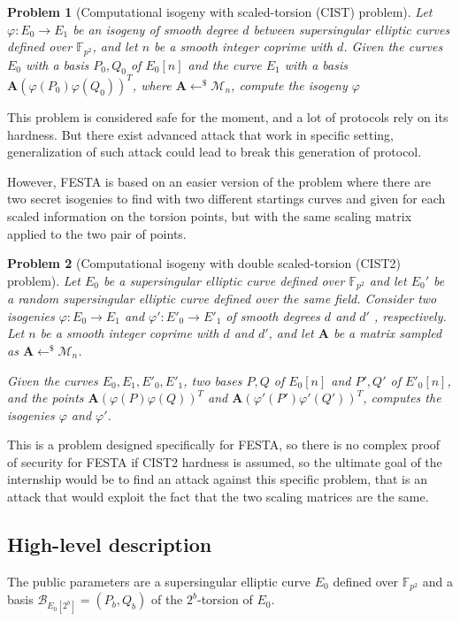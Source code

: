 \documentclass[12pt,a4paper]{article}
\newtheorem{problem}{Problem}
\begin{document}
			\begin{problem}[Computational isogeny with scaled-torsion (CIST) problem]

				Let $\varphi:E_0\to E_1$ be an isogeny of smooth degree $d$ between supersingular elliptic curves
				defined over $\mathbb F_{p^{2}}$, and let $n$ be a smooth integer coprime with $d$.
				Given the curves $E_0$ with a basis $P_0,Q_0$ of $E_0[n]$ and the curve $E_1$ with a basis
			$\mathbf A{(\varphi(P_0) \varphi(Q_0))}^{T}$, where $\mathbf A\gets^\$\mathcal M_n$, compute the
				isogeny  $\varphi$
			\end{problem}
	
			This problem is considered safe for the moment, and a lot of protocols rely on its hardness. But
			there exist advanced attack that work in specific setting, generalization of such attack could lead
			to break this generation of protocol. 


			However, FESTA is based on an easier version of the problem
			where there are two secret isogenies to find with two different startings curves and given
			for each scaled information on the torsion points, but with the same scaling matrix applied to the
			two pair of points.

		\begin{problem}[Computational isogeny with double scaled-torsion (CIST2) problem]
			Let $E_0$ be a supersingular elliptic curve defined over $\mathbb{F}_{p^2}$ and
			let  $E_0'$ be a random supersingular elliptic curve defined over the same field.
			Consider two isogenies $\varphi:E_0\to E_1$ and $\varphi':E'_0\to E'_1$ of smooth
			degrees $d$ and $d'$ , respectively. Let $n$ be a smooth integer coprime with $d$ and 
			$d'$, and let $\mathbf A $ be a matrix sampled as $\mathbf A\gets^{\$}\mathcal M_n$.

			Given the curves  $E_0,E_1,E'_0,E'_1$, two bases $P,Q$ of $E_0[n]$ and $P',Q'$ of
			$E'_0[n]$, and the points $\mathbf A(\varphi(P)\varphi(Q))^T$ and $\mathbf A
			(\varphi'(P')\varphi'(Q'))^T$, computes the isogenies $\varphi$ and $\varphi'$.
		\end{problem}

		This is a problem designed specifically for FESTA, so there is no complex proof of security for
		FESTA if CIST2 hardness is assumed, so the ultimate goal of the internship would be to find an attack
		against this specific problem, that is an attack that would exploit the fact that the two scaling
		matrices are the same.

		\subsection{High-level description}
		The public parameters are a supersingular elliptic curve $E_0$ defined over
		$\mathbb{F}_{p^2}$ and a basis $\mathcal B_{E_0[2^b]}=(P_b,Q_b)$ of the $2^b$-torsion
		of $E_0$.
\end{document}
